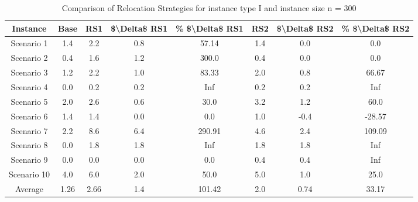 \begin{table}[H]
\centering
\begin{tabular}{cccccccc}
  \hline
  \textbf{Instance} & \textbf{Base} & \textbf{RS1} & \textbf{\$\textbackslash{}Delta\$  RS1} & \textbf{\% \$\textbackslash{}Delta\$  RS1} & \textbf{RS2} & \textbf{\$\textbackslash{}Delta\$  RS2} & \textbf{\% \$\textbackslash{}Delta\$  RS2} \\\hline
  Scenario 1 & 1.4 & 2.2 & 0.8 & 57.14 & 1.4 & 0.0 & 0.0 \\
  Scenario 2 & 0.4 & 1.6 & 1.2 & 300.0 & 0.4 & 0.0 & 0.0 \\
  Scenario 3 & 1.2 & 2.2 & 1.0 & 83.33 & 2.0 & 0.8 & 66.67 \\
  Scenario 4 & 0.0 & 0.2 & 0.2 & Inf & 0.2 & 0.2 & Inf \\
  Scenario 5 & 2.0 & 2.6 & 0.6 & 30.0 & 3.2 & 1.2 & 60.0 \\
  Scenario 6 & 1.4 & 1.4 & 0.0 & 0.0 & 1.0 & -0.4 & -28.57 \\
  Scenario 7 & 2.2 & 8.6 & 6.4 & 290.91 & 4.6 & 2.4 & 109.09 \\
  Scenario 8 & 0.0 & 1.8 & 1.8 & Inf & 1.8 & 1.8 & Inf \\
  Scenario 9 & 0.0 & 0.0 & 0.0 & 0.0 & 0.4 & 0.4 & Inf \\
  Scenario 10 & 4.0 & 6.0 & 2.0 & 50.0 & 5.0 & 1.0 & 25.0 \\
  Average & 1.26 & 2.66 & 1.4 & 101.42 & 2.0 & 0.74 & 33.17 \\\hline
\end{tabular}
\caption{Comparison of Relocation Strategies for instance type I and instance size n = 300}
\label{tab:wait:resrelocation-comparison_I_300}
\end{table}
